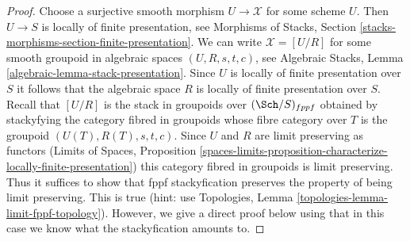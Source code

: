 \begin{proof}
Choose a surjective smooth morphism $U \to \mathcal{X}$ for some scheme $U$.
Then $U \to S$ is locally of finite presentation, see
Morphisms of Stacks, Section
\ref{stacks-morphisms-section-finite-presentation}.
We can write $\mathcal{X} = [U/R]$ for some smooth groupoid in
algebraic spaces $(U, R, s, t, c)$, see
Algebraic Stacks, Lemma \ref{algebraic-lemma-stack-presentation}.
Since $U$ is locally of finite presentation over $S$
it follows that the algebraic space $R$ is
locally of finite presentation over $S$.
Recall that $[U/R]$ is the stack in groupoids over $(\Sch/S)_{fppf}$
obtained by stackyfying the category fibred in groupoids
whose fibre category over $T$ is the groupoid $(U(T), R(T), s, t, c)$.
Since $U$ and $R$ are limit preserving as functors
(Limits of Spaces, Proposition
\ref{spaces-limits-proposition-characterize-locally-finite-presentation})
this category fibred in groupoids is limit preserving.
Thus it suffices to show that fppf stackyfication preserves
the property of being limit preserving. This is true
(hint: use Topologies, Lemma
\ref{topologies-lemma-limit-fppf-topology}).
However, we give a direct proof below using that in this
case we know what the stackyfication amounts to.


\end{proof}
